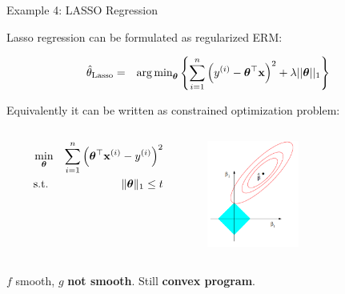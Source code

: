 \documentclass[11pt,compress,t,notes=noshow, xcolor=table]{beamer}
\begin{document}
\begin{vbframe}{Example 4: LASSO Regression}
	
Lasso regression can be formulated as regularized ERM: 

\begin{eqnarray*}  
		\hat{\theta}_{\text{Lasso}} &=&  \operatorname{arg\,min}_{\bm{\theta}} \left\{ \sum\limits_{i=1}^n \left(y^{(i)} - \bm{\theta}^\top\mathbf{x}\right)^2 + \lambda ||\bm{\theta}||_1 \right\} 
\end{eqnarray*}

Equivalently it can be written as constrained optimization problem: 

	\vspace*{-0.2cm}
	\begin{columns}[T] %
		\begin{column}{.48\textwidth}
			\begin{eqnarray*}
				\min_{\bm{\theta}} && \sum_{i = 1}^n \left(\bm{\theta}^\top \mathbf{x}^{(i)} - y^{(i)}\right)^2 \\
				\text{s.t. } && \|\bm{\theta}\|_1 \le t
			\end{eqnarray*}
		\end{column}

		\begin{column}{.48\textwidth}
			\begin{center}
				\includegraphics[width=0.45\textwidth, keepaspectratio]{figure_man/lasso.png} 
			\end{center}
		\end{column}
	\end{columns}	

\vspace*{0.2cm}

$f$ smooth, $g$ \textbf{not smooth}. Still \textbf{convex program}. 

\end{vbframe}
\end{document}
